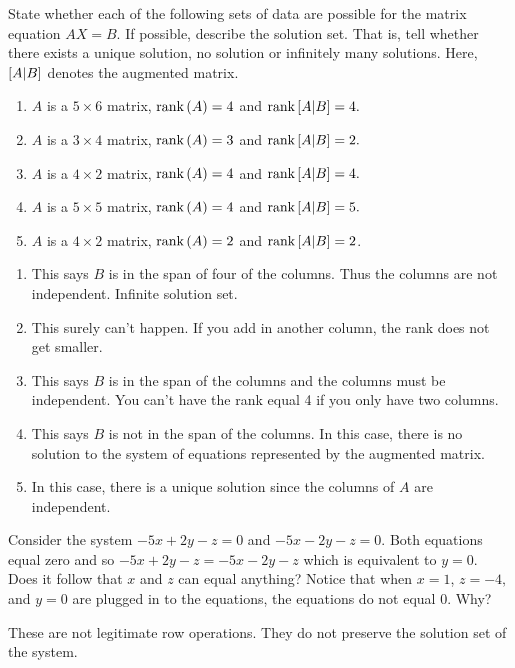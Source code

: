\begin{enumialphparenastyle}
\begin{ex} State whether each of the following sets of data are possible for the
matrix equation $AX=B$. If possible, describe the solution set.
That is, tell whether there exists a unique solution, no solution or
infinitely many solutions. Here, $\left[ A |B \right]$ denotes the augmented matrix.

\begin{enumerate}
\item $A$ is a $5\times 6$ matrix, $\mbox{rank}\left( A\right) =4$ and 
$\mbox{rank}\left[ A|B \right] =4.$ 

\item $A$ is a $3\times 4$ matrix, $\mbox{rank}\left( A\right) =3$ and 
$\mbox{rank}\left[ A|B\right] =2.$

\item $A$ is a $4\times 2$ matrix, $\mbox{rank}\left( A\right) =4$ and 
$\mbox{rank}\left[ A|B \right] =4.$ 

\item $A$ is a $5\times 5$ matrix, $\mbox{rank}\left( A\right) =4$ and 
$\mbox{rank}\left[ A|B \right] =5.$ 

\item $A$ is a $4\times 2$ matrix, $\mbox{rank}\left( A\right) =2$ and 
$\mbox{rank}\left[ A|B \right] =2$.
\end{enumerate}

\begin{sol}
\begin{enumerate}
\item This says $B$ is in the span of four of the columns. Thus the columns are not independent. Infinite solution set.
\item This surely can't happen. If you add in another column, the rank does not get smaller.
\item This says $B$ is in the span of the columns and the columns must be
independent. You can't have the rank equal 4 if you only have two columns.
\item This says $B$ is not in the span of the columns. In this case, there is no solution to the system of equations represented by the augmented matrix.
\item In this case, there is a
unique solution since the columns of $A$ are independent.
\end{enumerate}
\end{sol}
\end{ex}

\begin{ex} Consider the system $-5x+2y-z=0$ and $-5x-2y-z=0.$ Both equations
equal zero and so $-5x+2y-z=-5x-2y-z$ which is equivalent to $y=0.$ Does it follow that $x$
and $z$ can equal anything?  Notice that when $x=1$, $z=-4,$ and $y=0$ are plugged in
to the equations, the equations do not equal $0$. Why?
\begin{sol}
These are not legitimate row
operations. They do not preserve the solution set of the system.
\end{sol}
\end{ex}

\end{enumialphparenastyle}
